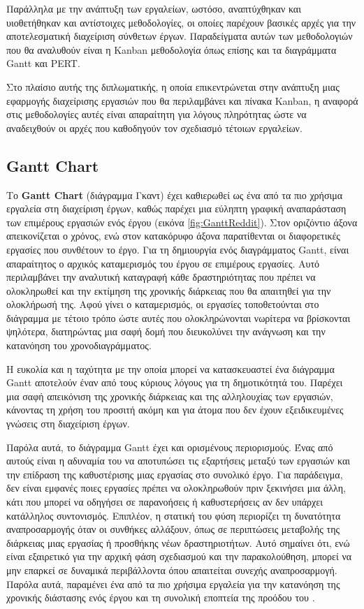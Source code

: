         Παράλληλα με την ανάπτυξη των εργαλείων, ωστόσο, αναπτύχθηκαν και υιοθετήθηκαν και αντίστοιχες μεθοδολογίες, οι οποίες παρέχουν βασικές αρχές για την αποτελεσματική διαχείριση σύνθετων έργων. Παραδείγματα αυτών των μεθοδολογιών που θα αναλυθούν είναι η Kanban μεθοδολογία όπως επίσης και τα διαγράμματα Gantt και PERT.

        Στο πλαίσιο αυτής της διπλωματικής, η οποία επικεντρώνεται στην ανάπτυξη μιας εφαρμογής διαχείρισης εργασιών που θα περιλαμβάνει και πίνακα Kanban, η αναφορά στις μεθοδολογίες αυτές είναι απαραίτητη για λόγους πληρότητας ώστε να αναδειχθούν οι αρχές που καθοδηγούν τον σχεδιασμό τέτοιων εργαλείων.

        \subsection{Gantt Chart}
            Το \textbf{Gantt Chart} (διάγραμμα Γκαντ) έχει καθιερωθεί ως ένα από τα πιο χρήσιμα εργαλεία στη διαχείριση έργων, καθώς παρέχει μια εύληπτη γραφική αναπαράσταση των επιμέρους εργασιών ενός έργου (εικόνα \ref{fig:GanttReddit}). Στον οριζόντιο άξονα απεικονίζεται ο χρόνος, ενώ στον κατακόρυφο άξονα παρατίθενται οι διαφορετικές εργασίες που συνθέτουν το έργο.  Για τη δημιουργία ενός διαγράμματος Gantt, είναι απαραίτητος ο αρχικός καταμερισμός του έργου σε επιμέρους εργασίες. Αυτό περιλαμβάνει την αναλυτική καταγραφή κάθε δραστηριότητας που πρέπει να ολοκληρωθεί και την εκτίμηση της χρονικής διάρκειας που θα απαιτηθεί για την ολοκλήρωσή της. Αφού γίνει ο καταμερισμός, οι εργασίες τοποθετούνται στο διάγραμμα με τέτοιο τρόπο ώστε αυτές που ολοκληρώνονται νωρίτερα να βρίσκονται ψηλότερα, διατηρώντας μια σαφή δομή που διευκολύνει την ανάγνωση και την κατανόηση του χρονοδιαγράμματος.

            Η ευκολία και η ταχύτητα με την οποία μπορεί να κατασκευαστεί ένα διάγραμμα Gantt αποτελούν έναν από τους κύριους λόγους για τη δημοτικότητά του. Παρέχει μια σαφή απεικόνιση της χρονικής διάρκειας και της αλληλουχίας των εργασιών, κάνοντας τη χρήση του προσιτή ακόμη και για άτομα που δεν έχουν εξειδικευμένες γνώσεις στη διαχείριση έργων.

            Παρόλα αυτά, το διάγραμμα Gantt έχει και ορισμένους περιορισμούς. Ένας από αυτούς είναι η αδυναμία του να αποτυπώσει τις εξαρτήσεις μεταξύ των εργασιών και την επίδραση της καθυστέρισης μιας εργασίας στο συνολικό έργο. Για παράδειγμα, δεν είναι εμφανές ποιες εργασίες πρέπει να ολοκληρωθούν πριν ξεκινήσει μια άλλη, κάτι που μπορεί να οδηγήσει σε παρανοήσεις ή καθυστερήσεις αν δεν υπάρχει κατάλληλος συντονισμός. Επιπλέον, η στατική του φύση περιορίζει τη δυνατότητα αναπροσαρμογής όταν οι συνθήκες αλλάξουν, όπως σε περιπτώσεις μεταβολής της διάρκειας μιας εργασίας ή προσθήκης νέων δραστηριοτήτων. Αυτό σημαίνει ότι, ενώ είναι εξαιρετικό για την αρχική φάση σχεδιασμού και την παρακολούθηση, μπορεί να μην επαρκεί σε δυναμικά περιβάλλοντα όπου απαιτείται συνεχής αναπροσαρμογή. Παρόλα αυτά, παραμένει ένα από τα πιο χρήσιμα εργαλεία για την κατανόηση της χρονικής διάστασης ενός έργου και τη συνολική εποπτεία της προόδου του \cite{Xenos}.

